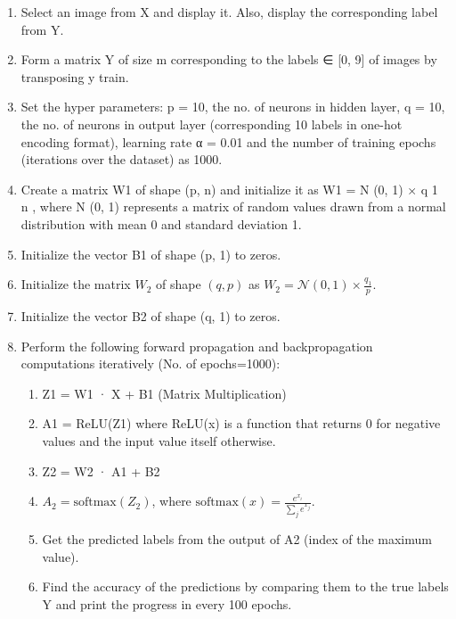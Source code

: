 \begin{enumerate}
    \item Select an image from X and display it. Also, display the corresponding label from
Y.

    \item Form a matrix Y of size m corresponding to the labels ∈ [0, 9] of images by transposing y train.

    \item Set the hyper parameters: p = 10, the no. of neurons in hidden layer, q = 10,
the no. of neurons in output layer (corresponding 10 labels in one-hot encoding
format), learning rate α = 0.01 and the number of training epochs (iterations over
the dataset) as 1000.

    \item Create a matrix W1 of shape (p, n) and initialize it as W1 = N (0, 1) ×
q
1
n
, where
N (0, 1) represents a matrix of random values drawn from a normal distribution with
mean 0 and standard deviation 1.

    \item Initialize the vector B1 of shape (p, 1) to zeros.

    \item Initialize the matrix $W_2$ of shape $(q, p)$ as $W_2 = \mathcal{N}(0, 1) \times \frac{q_1}{p}$.

    \item Initialize the vector B2 of shape (q, 1) to zeros.

    \item Perform the following forward propagation and backpropagation computations iteratively (No. of epochs=1000):
        \begin{enumerate}
        \item  Z1 = W1 · X + B1 (Matrix Multiplication)
        \item A1 = ReLU(Z1) where ReLU(x) is a function that returns 0 for negative values
and the input value itself otherwise.

        \item Z2 = W2 · A1 + B2
        \item $A_2 = \text{softmax}(Z_2)$, where $\text{softmax}(x) = \frac{e^{x_i}}{\sum_j e^{x_j}}$.

        \item Get the predicted labels from the output of A2 (index of the maximum value).

        \item Find the accuracy of the predictions by comparing them to the true labels Y
and print the progress in every 100 epochs.


\end{enumerate}
\end{enumerate}
